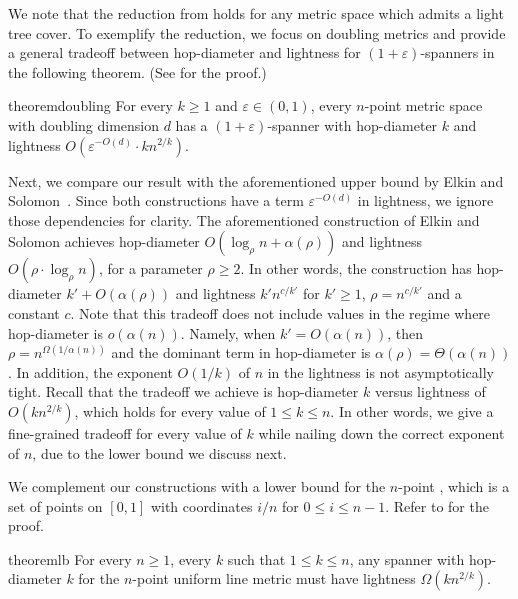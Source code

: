 \documentclass[11pt,english]{article}
\newcommand{\ddim}{d}
\renewcommand{\emph}[1]{{\color{MyGreen}{\em #1}}}
\newcommand{\eps}{\varepsilon}
\begin{document}
We note that the reduction from  holds for any metric space which admits a light tree cover. To exemplify the reduction, we focus on doubling metrics and provide a general tradeoff between hop-diameter and lightness for $(1+\eps)$-spanners in the following theorem. (See  for the proof.)
\begin{restatable}{theorem}{doubling}\label{thm:doubling}
For every $k\ge 1$ and $\eps \in (0,1)$, every $n$-point metric space with doubling dimension $\ddim$ has a $(1+\eps)$-spanner with hop-diameter $k$ and lightness $O(\eps^{-O(\ddim)}\cdot kn^{2/k})$.
\end{restatable}
Next, we compare our result with the aforementioned upper bound by Elkin and Solomon~\cite{ES15}. Since both constructions have a term $\eps^{-O(\ddim)}$ in lightness, we ignore those dependencies for clarity.
The aforementioned construction of Elkin and Solomon \cite{ES15} achieves hop-diameter $O(\log_{\rho}{n} + \alpha(\rho))$ and lightness $O(\rho\cdot \log_{\rho}{n})$, for a parameter $\rho \ge 2$. In other words, the construction has hop-diameter $k' + O(\alpha(\rho))$ and lightness $k'n^{c/k'}$ for $k' \ge 1$, $\rho = n^{c/k'}$ and a constant $c$. Note that this tradeoff does not include values in the regime where hop-diameter is $o(\alpha(n))$. Namely, when $k'=O(\alpha(n))$, then $\rho=n^{\Omega(1/\alpha(n))}$ and the dominant term in hop-diameter is $\alpha(\rho)= \Theta(\alpha(n))$. In addition, the exponent $O(1/k)$ of $n$ in the lightness is not asymptotically tight. Recall that the tradeoff we achieve is hop-diameter $k$ versus lightness of $O(kn^{2/k})$, which holds for every value of $1 \le k \le n$. In other words, we give a fine-grained tradeoff for every value of $k$ while nailing down the correct exponent of $n$, due to the lower bound we discuss next.

We complement our constructions with a lower bound for the  $n$-point \emph{uniform line metric}, which is a set of points on $[0,1]$ with coordinates $i/n$ for $0\le i \le n-1$. Refer to  for the proof.
\begin{restatable}{theorem}{lb}\label{thm:lb}
For every $n \ge 1$, every $k$ such that $1 \le k \le n$, any spanner with hop-diameter $k$  for the $n$-point uniform line metric must have lightness  $\Omega(kn^{2/k})$.
\end{restatable}
\end{document}
